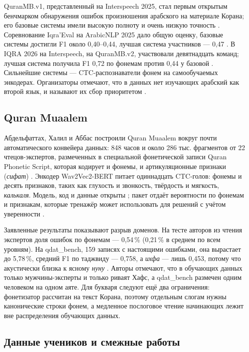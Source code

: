 QuranMB.v1, представленный на Interspeech 2025, стал первым открытым бенчмарком обнаружения ошибок
произношения арабского на материале Корана; его базовые системы имели высокую полноту и очень низкую
точность \cite{SRC-004}. Соревнование Iqra'Eval на ArabicNLP 2025 дало общую оценку, базовые системы
достигли F1 около 0,40--0,44, лучшая система участников --- 0,47 \cite{SRC-043}. В IQRA 2026 на Interspeech, на QuranMB.v2, участвовали
девятнадцать команд; лучшая система получила F1 0,72 по фонемам против 0,44 у базовой
\cite{SRC-031,SRC-086}. Сильнейшие системы --- CTC-распознаватели фонем на самообучаемых энкодерах.
Организаторы отмечают, что в данных нет изучающих арабский как второй язык, и называют их сбор
приоритетом \cite{SRC-031}.

\subsection{Quran Muaalem}

Абдельфаттах, Халил и Аббас построили Quran Muaalem вокруг почти автоматического конвейера данных: 848
часов и около 286 тыс. фрагментов от 22 чтецов-экспертов, размеченных в специальной фонетической записи
Quran Phonetic Script, которая кодирует и фонемы, и артикуляционные признаки (\emph{сифат})
\cite{SRC-002}. Энкодер Wav2Vec2-BERT питает одиннадцать CTC-голов: фонемы и десять признаков, таких как
глухость и звонкость, твёрдость и мягкость, \emph{калькаля}. Модель, код и данные открыты \cite{SRC-003};
пакет отдаёт вероятности по фонемам и признакам, которые тренажёр может использовать для решений с учётом
уверенности \cite{SRC-062}.

Заявленные результаты показывают разрыв доменов. На тесте авторов из чтения экспертов доля ошибок по
фонемам --- 0,54\,\% (0,21\,\% в среднем по всем уровням). На qdat\_bench, 159 записях с настоящими
ошибками, она вырастает до 5,78\,\%, средний F1 по таджвиду --- 0,758, а \emph{ихфа} --- лишь 0,453, потому
что акустически близка к ясному \emph{нуну} \cite{SRC-002}. Авторы отмечают, что в обучающих данных только
мужчины-эксперты и только риваят Хафс, а qdat\_bench размечен одним человеком на одном аяте. Для букваря
следуют ещё два ограничения: фонетизатор рассчитан на текст Корана, поэтому отдельным слогам нужны
канонические строки фонем, а медленное послоговое чтение начинающих лежит вне распределения обучающих
данных.

\subsection{Данные учеников и смежные работы}

